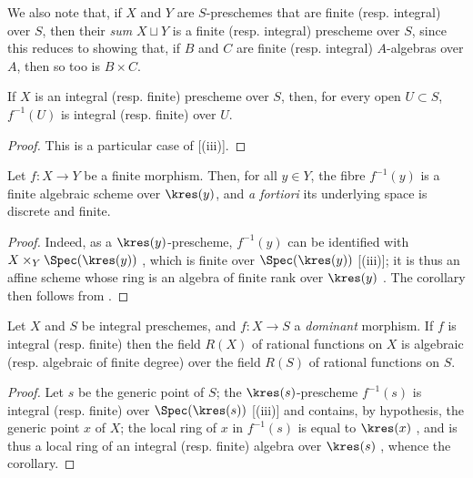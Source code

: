 We also note that, if $X$ and $Y$ are $S$-preschemes that are finite (resp. integral) over $S$, then their \emph{sum} $X\sqcup Y$ is a finite (resp. integral) prescheme over $S$, since this reduces to showing that, if $B$ and $C$ are finite (resp. integral) $A$-algebras over $A$, then so too is $B\times C$.

\begin{corollary}[6.1.6]
\label{II.6.1.6}
If $X$ is an integral (resp. finite) prescheme over $S$, then, for every open $U\subset S$, $f^{-1}(U)$ is integral (resp. finite) over $U$.
\end{corollary}

\begin{proof}
This is a particular case of [(iii)].
\end{proof}

\begin{corollary}[6.1.7]
\label{II.6.1.7}
Let $f:X\to Y$ be a finite morphism.
Then, for all $y\in Y$, the fibre $f^{-1}(y)$ is a finite algebraic scheme over $\kres(y)$, and \emph{a fortiori} its underlying space is discrete and finite.
\end{corollary}

\begin{proof}
Indeed, as a $\kres(y)$-prescheme, $f^{-1}(y)$ can be identified with $X\times_Y\Spec(\kres(y))$ , which is finite over $\Spec(\kres(y))$ [(iii)];
it is thus an affine scheme whose ring is an algebra of finite rank over $\kres(y)$ .
The corollary then follows from .
\end{proof}

\begin{corollary}[6.1.8]
\label{II.6.1.8}
Let $X$ and $S$ be integral preschemes, and $f:X\to S$ a \emph{dominant} morphism.
If $f$ is integral (resp. finite) then the field $R(X)$ of rational functions on $X$ is algebraic (resp. algebraic of finite degree) over the field $R(S)$ of rational functions on $S$.
\end{corollary}

\begin{proof}
Let $s$ be the generic point of $S$;
the $\kres(s)$-prescheme $f^{-1}(s)$ is integral (resp. finite) over $\Spec(\kres(s))$ [(iii)] and contains, by hypothesis, the generic point $x$ of $X$;
  the local ring of $x$ in $f^{-1}(s)$ is equal to $\kres(x)$ , and is thus a local ring of an integral (resp. finite) algebra over $\kres(s)$ , whence the corollary.
\end{proof}

